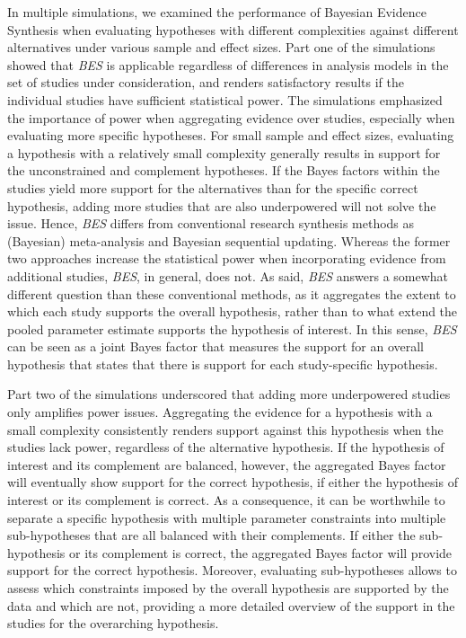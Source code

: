 \documentclass[
]{article}
\begin{document}
In multiple simulations, we examined the performance of Bayesian
Evidence Synthesis when evaluating hypotheses with different
complexities against different alternatives under various sample and
effect sizes. Part one of the simulations showed that \emph{BES} is
applicable regardless of differences in analysis models in the set of
studies under consideration, and renders satisfactory results if the
individual studies have sufficient statistical power. The simulations
emphasized the importance of power when aggregating evidence over
studies, especially when evaluating more specific hypotheses. For small
sample and effect sizes, evaluating a hypothesis with a relatively small
complexity generally results in support for the unconstrained and
complement hypotheses. If the Bayes factors within the studies yield
more support for the alternatives than for the specific correct
hypothesis, adding more studies that are also underpowered will not
solve the issue. Hence, \emph{BES} differs from conventional research
synthesis methods as (Bayesian) meta-analysis and Bayesian sequential
updating. Whereas the former two approaches increase the statistical
power when incorporating evidence from additional studies, \emph{BES},
in general, does not. As said, \emph{BES} answers a somewhat different
question than these conventional methods, as it aggregates the extent to
which each study supports the overall hypothesis, rather than to what
extend the pooled parameter estimate supports the hypothesis of
interest. In this sense, \emph{BES} can be seen as a joint Bayes factor
that measures the support for an overall hypothesis that states that
there is support for each study-specific hypothesis.

Part two of the simulations underscored that adding more underpowered
studies only amplifies power issues. Aggregating the evidence for a
hypothesis with a small complexity consistently renders support against
this hypothesis when the studies lack power, regardless of the
alternative hypothesis. If the hypothesis of interest and its complement
are balanced, however, the aggregated Bayes factor will eventually show
support for the correct hypothesis, if either the hypothesis of interest
or its complement is correct. As a consequence, it can be worthwhile to
separate a specific hypothesis with multiple parameter constraints into
multiple sub-hypotheses that are all balanced with their complements. If
either the sub-hypothesis or its complement is correct, the aggregated
Bayes factor will provide support for the correct hypothesis. Moreover,
evaluating sub-hypotheses allows to assess which constraints imposed by
the overall hypothesis are supported by the data and which are not,
providing a more detailed overview of the support in the studies for the
overarching hypothesis.
\end{document}
